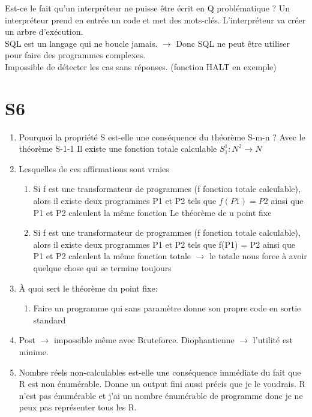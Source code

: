 \documentclass{report}
\begin{document}
Est-ce le fait qu'un interpréteur ne puisse être écrit en Q problématique ?
Un interpréteur prend en entrée un code et met des mots-clés. L'interpréteur va créer un arbre d'exécution.\\
SQL est un langage qui ne boucle jamais. $\rightarrow$ Donc SQL ne peut être utiliser pour faire des programmes complexes.\\

Impossible de détecter les cas sans réponses. (fonction HALT en exemple)

\section{S6}
\begin{enumerate}
\item Pourquoi la propriété S est-elle une conséquence du théorème S-m-n ? Avec le théorème S-1-1 Il existe une fonction totale calculable $S_1^1:N^2\rightarrow N$
\item Lesquelles de ces affirmations sont vraies
\begin{enumerate}
	\item Si f est une transformateur de programmes (f fonction totale calculable), alors il existe deux programmes P1 et P2 tels que $f(P1) = P2$ ainsi que P1 et P2 calculent la même fonction  Le théorème de u point fixe
	\item Si f est une transformateur de programmes (f fonction totale calculable), alors il existe deux programmes P1 et P2 tels que f(P1) = P2 ainsi que P1 et P2 calculent la même fonction totale $\rightarrow$ le totale nous force à avoir quelque chose qui se termine toujours
\end{enumerate}
\item À quoi sert le théorème du point fixe:
\begin{enumerate}
\item Faire un programme qui sans paramètre donne son propre code en sortie standard
\end{enumerate}
\item Post $\rightarrow$ impossible même avec Bruteforce. Diophantienne $\rightarrow$ l'utilité est minime.
\item Nombre réels non-calculables est-elle une conséquence immédiate du fait que R est non énumérable.
Donne un output fini aussi précis que je le voudrais. R n'est pas énumérable et j'ai un nombre énumérable de programme donc je ne peux pas représenter tous les R.
\end{enumerate}
\end{document}

